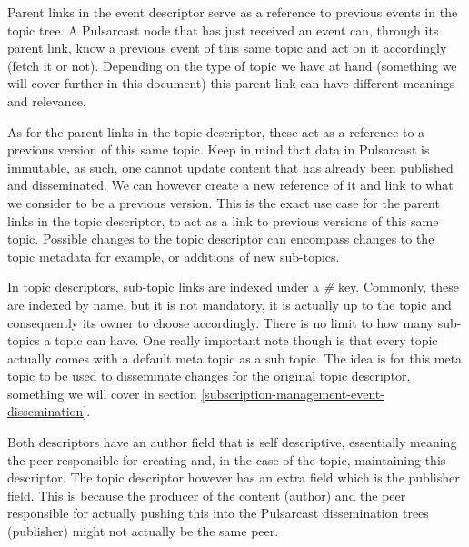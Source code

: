 Parent links in the event descriptor serve as a reference to previous events in
the topic tree. A Pulsarcast node that has just received an event can, through
its parent link, know a previous event of this same topic and act on it
accordingly (fetch it or not). Depending on the type of topic we have at hand
(something we will cover further in this document) this parent link can have
different meanings and relevance.

As for the parent links in the topic descriptor, these act as a reference to a
previous version of this same topic. Keep in mind that data in Pulsarcast is
immutable, as such, one cannot update content that has already been published
and disseminated. We can however create a new reference of it and link to what
we consider to be a previous version. This is the exact use case for the parent
links in the topic descriptor, to act as a link to previous versions of this
same topic. Possible changes to the topic descriptor can encompass changes to
the topic metadata for example, or additions of new sub-topics.

In topic descriptors, sub-topic links are indexed under a \emph{\#} key.
Commonly, these are indexed by name, but it is not mandatory, it is actually up
to the topic and consequently its owner to choose accordingly.  There is no
limit to how many sub-topics a topic can have. One really important note though is that every topic actually comes with a default meta topic as a sub topic. The idea is for this meta topic to be used to disseminate changes for the original topic descriptor, something we will cover in section \ref{subscription-management-event-dissemination}.

Both descriptors have an author field that is self descriptive, essentially
meaning the peer responsible for creating and, in the case of the topic,
maintaining this descriptor. The topic descriptor however has an extra field
which is the publisher field. This is because the producer of the content
(author) and the peer responsible for actually pushing this into the Pulsarcast
dissemination trees (publisher) might not actually be the same peer.

